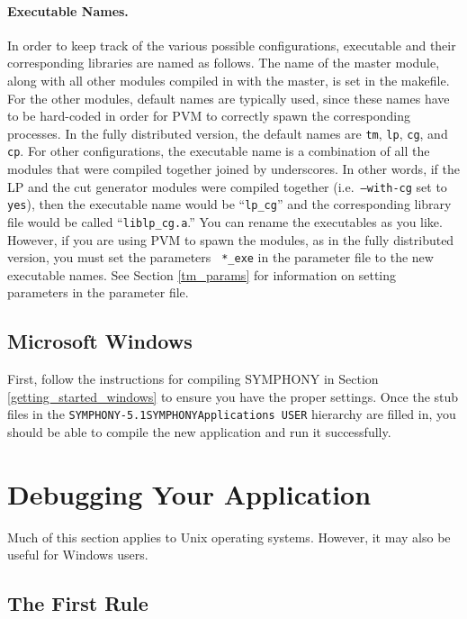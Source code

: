 \paragraph{Executable Names.}
\label{exe_names}
In order to keep track of the various possible configurations, executable and
their corresponding libraries are named as follows. The name of the master
module, along with all other modules compiled in with the master, is set in
the makefile. For the other modules, default names are typically used, since
these names have to be hard-coded in order for PVM to correctly spawn the
corresponding processes.  In the fully distributed version, the default names
are \texttt{tm}, \texttt{lp}, \texttt{cg}, and \texttt{cp}. For other
configurations, the executable name is a combination of all the modules that
were compiled together joined by underscores. In other words, if the LP and
the cut generator modules were compiled together (i.e.~{\tt --with-cg}
set to {\tt yes}), then the executable name would be ``{\tt lp\_cg}'' and the
corresponding library file would be called ``{\tt liblp\_cg.a}.'' You can
rename the executables as you like. However, if you are using PVM to spawn the
modules, as in the fully distributed version, you must set the parameters {\tt
*\_exe} in the parameter file to the new executable names. See Section
\ref{tm_params} for information on setting parameters in the parameter file.

\subsection{Microsoft Windows}

First, follow the instructions for compiling SYMPHONY in Section
\ref{getting_started_windows} to ensure you have the proper settings. Once the
stub files in the {\tt SYMPHONY-5.1\bs SYMPHONY\bs Applications \bs USER} 
hierarchy are filled in, you should be able to compile the new application 
and run it successfully. 

\section{Debugging Your Application}

Much of this section applies to Unix operating systems. However, it may
also be useful for Windows users.

\subsection{The First Rule}

